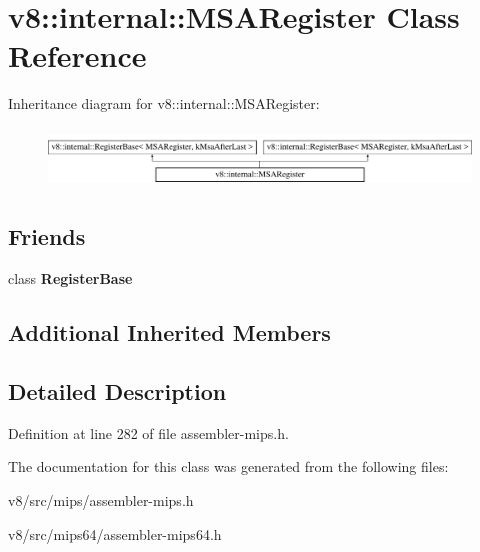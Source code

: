 \hypertarget{classv8_1_1internal_1_1MSARegister}{}\section{v8\+:\+:internal\+:\+:M\+S\+A\+Register Class Reference}
\label{classv8_1_1internal_1_1MSARegister}
Inheritance diagram for v8\+:\+:internal\+:\+:M\+S\+A\+Register\+:\begin{figure}[H]
\begin{center}
\leavevmode
\includegraphics[height=1.600000cm]{classv8_1_1internal_1_1MSARegister}
\end{center}
\end{figure}
\subsection*{Friends}
\begin{DoxyCompactItemize}
\item 
\mbox{\label{classv8_1_1internal_1_1MSARegister_a960d84c54d6f69c7f2d3cf54e7fd6938}} 
class {\bfseries Register\+Base}
\end{DoxyCompactItemize}
\subsection*{Additional Inherited Members}


\subsection{Detailed Description}


Definition at line 282 of file assembler-\/mips.\+h.



The documentation for this class was generated from the following files\+:\begin{DoxyCompactItemize}
\item 
v8/src/mips/assembler-\/mips.\+h\item 
v8/src/mips64/assembler-\/mips64.\+h\end{DoxyCompactItemize}
